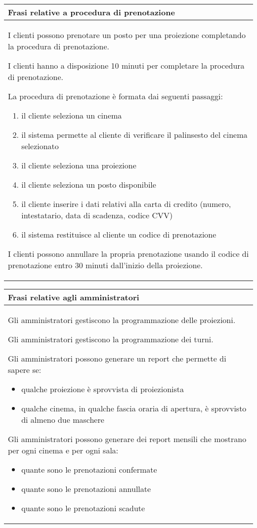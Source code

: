 \begin{tabularx}{\linewidth}{|X|}
    \hline
    \rowcolor{tblhdrcolor}
    \textbf{Frasi relative a procedura di prenotazione} \\\hline
    I clienti possono prenotare un posto per una proiezione
    completando la procedura di prenotazione.

    I clienti hanno a disposizione 10 minuti per completare la
    procedura di prenotazione.

    La procedura di prenotazione è formata dai seguenti passaggi:
    \begin{enumerate}
        \item il cliente seleziona un cinema
        \item il sistema permette al cliente di verificare
              il palinsesto del cinema selezionato
        \item il cliente seleziona una proiezione
        \item il cliente seleziona un posto disponibile
        \item il cliente inserire i dati relativi alla carta
              di credito (numero, intestatario, data di scadenza,
              codice CVV)
        \item il sistema restituisce al cliente un codice di
              prenotazione
    \end{enumerate}

    I clienti possono annullare la propria prenotazione usando il
    codice di prenotazione entro 30 minuti dall'inizio della
    proiezione.
    \\ \hline
\end{tabularx}

\begin{tabularx}{\linewidth}{|X|}
    \hline
    \rowcolor{tblhdrcolor}
    \textbf{Frasi relative agli amministratori} \\\hline
    Gli amministratori gestiscono la programmazione delle proiezioni.

    Gli amministratori gestiscono la programmazione dei turni.

    Gli amministratori possono generare un report che permette di
    sapere se:
    \begin{itemize}
        \item qualche proiezione è sprovvista di proiezionista
        \item qualche cinema, in qualche fascia oraria di apertura,
              è sprovvisto di almeno due maschere
    \end{itemize}

    Gli amministratori possono generare dei report mensili che
    mostrano per ogni cinema e per ogni sala:
    \begin{itemize}
        \item quante sono le prenotazioni confermate
        \item quante sono le prenotazioni annullate
        \item quante sono le prenotazioni scadute
    \end{itemize}
    \\ \hline
\end{tabularx}

